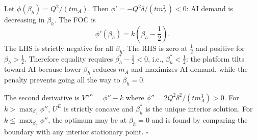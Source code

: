 \documentclass[mnsc,nonblindrev]{informs3_NoOR}
\begin{document}
Let $\phi(\beta_h)=Q^2/(tm_A)$. Then $\phi'=-Q^2\delta/(tm_A^2)<0$: AI demand is decreasing in $\beta_h$. The FOC is
\[
\phi'(\beta_h) = k\!\left(\beta_h-\frac{1}{2}\right).
\]
The LHS is strictly negative for all $\beta_h$. The RHS is zero at $\frac{1}{2}$ and positive for $\beta_h>\frac{1}{2}$. Therefore equality requires $\beta_h^*-\frac{1}{2}<0$, i.e., $\beta_h^*<\frac{1}{2}$: the platform tilts toward AI because lower $\beta_h$ reduces $m_A$ and maximizes AI demand, while the penalty prevents going all the way to $\beta_h=0$.
 
The second derivative is $V''^E = \phi''-k$ where $\phi''=2Q^2\delta^2/(tm_A^3)>0$. For $k>\max_{\beta_h}\phi''$, $U^E$ is strictly concave and $\beta_h^*$ is the unique interior solution. For $k \leq \max_{\beta_h}\phi''$, the optimum may be at $\beta_h=0$ and is found by comparing the boundary with any interior stationary point. \hfill$\square$
\end{document}
